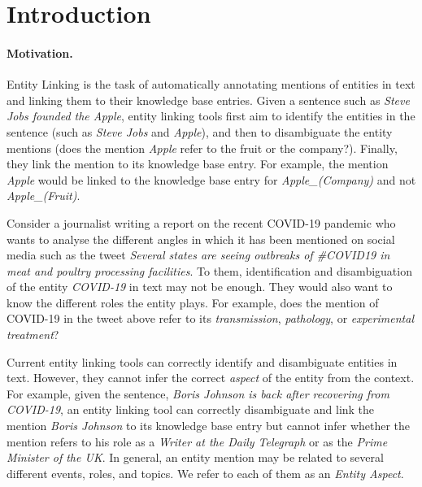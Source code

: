 \documentclass[sigconf,authordraft]{acmart}
\begin{document}

\maketitle

\section{Introduction}
\label{sec:Introduction}

\paragraph{\textbf{Motivation.}} 
Entity Linking is the task of automatically annotating mentions of entities in text and linking them to their knowledge base entries. Given a sentence such as \textit{Steve Jobs founded the Apple}, entity linking tools first aim to identify the entities in the sentence (such as \textit{Steve Jobs} and \textit{Apple}), and then to disambiguate the entity mentions (does the mention \textit{Apple} refer to the fruit or the company?). Finally, they link the mention to its knowledge base entry. For example, the mention \textit{Apple} would be linked to the knowledge base entry for \textit{Apple\_(Company)} and not \textit{Apple\_(Fruit)}.

Consider a journalist  writing a report on the recent COVID-19 pandemic who wants to analyse the different angles in which it has been mentioned on social media such as the tweet \textit{Several states are seeing outbreaks of \#COVID19 in meat and poultry processing facilities}. To them, identification and disambiguation of the entity \textit{COVID-19} in text may not be enough. They would also want to know the different roles the entity plays. For example, does the mention of COVID-19 in the tweet above refer to its \textit{transmission}, \textit{pathology}, or \textit{experimental treatment}? 

Current entity linking tools \cite{ferragina2010tagme,mendes2011dbpedia,piccinno2014wat} can correctly identify and disambiguate entities in text. However, they cannot infer the correct \textit{aspect} of the entity from the context. For example, given the sentence, \textit{Boris Johnson is back after recovering from COVID-19}, an entity linking tool can correctly disambiguate and link the mention \textit{Boris Johnson} to its knowledge base entry but cannot infer whether the mention refers to his role as a \textit{Writer at the Daily Telegraph} or as the \textit{Prime Minister of the UK}. In general, an entity mention may be related to several different events, roles, and topics. We refer to each of them as an \textit{Entity Aspect}. 
\end{document}
